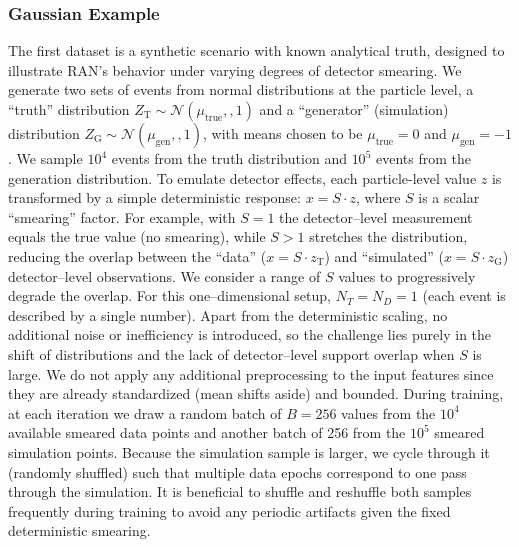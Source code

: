 {{        \subsubsection{Gaussian Example}
            The first dataset is a synthetic scenario with known analytical truth, designed to illustrate RAN’s behavior under varying degrees of detector smearing.
            We generate two sets of events from normal distributions at the particle level, a “truth” distribution $Z_{\text{T}} \sim \mathcal{N}(\mu_{\text{true}},,1)$ and a “generator” (simulation) distribution $Z_{\text{G}} \sim \mathcal{N}(\mu_{\text{gen}},,1)$, with means chosen to be $\mu_{\text{true}}=0$ and $\mu_{\text{gen}}=-1$.
            We sample $10^4$ events from the truth distribution and $10^5$ events from the generation distribution.
            To emulate detector effects, each particle-level value $z$ is transformed by a simple deterministic response: $x = S \cdot z$, where $S$ is a scalar “smearing” factor.
            For example, with $S=1$ the detector--level measurement equals the true value (no smearing), while $S>1$ stretches the distribution, reducing the overlap between the “data” ($x = S\cdot z_{\text{T}}$) and “simulated” ($x = S\cdot z_{\text{G}}$) detector--level observations.
            We consider a range of $S$ values to progressively degrade the overlap.
            For this one--dimensional setup, $N_T = N_D = 1$ (each event is described by a single number).
            Apart from the deterministic scaling, no additional noise or inefficiency is introduced, so the challenge lies purely in the shift of distributions and the lack of detector--level support overlap when $S$ is large.
            We do not apply any additional preprocessing to the input features since they are already standardized (mean shifts aside) and bounded.
            During training, at each iteration we draw a random batch of $B=256$ values from the $10^4$ available smeared data points and another batch of 256 from the $10^5$ smeared simulation points.
            Because the simulation sample is larger, we cycle through it (randomly shuffled) such that multiple data epochs correspond to one pass through the simulation.
            It is beneficial to shuffle and reshuffle both samples frequently during training to avoid any periodic artifacts given the fixed deterministic smearing.
            
}}
